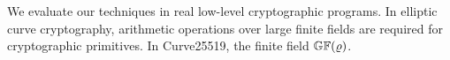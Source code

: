 
We evaluate our techniques in real low-level cryptographic programs. 
In elliptic curve cryptography, arithmetic operations over large
finite fields are required for cryptographic primitives. In
Curve25519, the finite field $\mathbb{GF}(\varrho)$.
